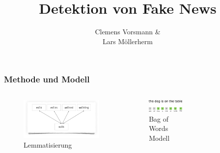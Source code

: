 \documentclass[aspectratio=1610, professionalfonts, 9pt]{beamer}
\title{Detektion von Fake News}
\author{%
  Clemens Vorsmann \& \\ 
  Lars Möllerherm
}
\institute{Fakultät Physik}
\begin{document}
  \begin{frame}
    \titlepage
  \end{frame}

  \begin{frame}
    \frametitle{Methode und Modell}
    \begin{columns}
      \begin{figure}
        \includegraphics[width=\textwidth]{pictures/lemma.png}
        \caption{Lemmatisierung \cite{lemma}}
      \end{figure}  
      \begin{figure}
          \includegraphics[width=\textwidth]{pictures/bow_schematisch.png}
          \caption{Bag of Words Modell \cite{bow_pic}}
          \label{}
      \end{figure}
      \begin{figure}

\end{figure}
\end{columns}
\end{frame}
\end{document}
